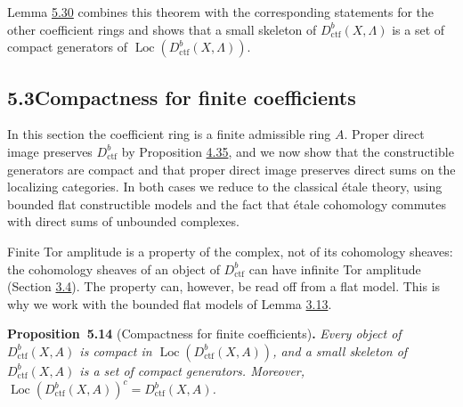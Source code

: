 \documentclass[11pt]{article}
\newenvironment{bpstatement}[2]{\par\addvspace{0.6\baselineskip}\noindent\textbf{#1}#2\textbf{.}\enspace\ignorespaces}
  {\par\addvspace{0.4\baselineskip}}
\newenvironment{bpstatementit}[2]{\begin{bpstatement}{#1}{#2}\itshape\ignorespaces}{\end{bpstatement}}
\providecommand{\Loc}{}\renewcommand{\Loc}{\operatorname{Loc}}
\begin{document}
\label{bp448}%
Lemma \hyperref[bp503]{5.30} combines this theorem with the corresponding statements for the other coefficient rings and shows that a small skeleton of \(D^b_{\mathrm{ctf}}(X,\Lambda)\) is a set of compact generators of \(\Loc(D^b_{\mathrm{ctf}}(X,\Lambda))\).



\subsection*{\texorpdfstring{5.3\quad Compactness for finite coefficients}{5.3 Compactness for finite coefficients}}
\label{bp449}%
\label{bp450}%
In this section the coefficient ring is a finite admissible ring \(A\). Proper direct image preserves \(D^b_{\mathrm{ctf}}\) by Proposition \hyperref[bp390]{4.35}, and we now show that the constructible generators are compact and that proper direct image preserves direct sums on the localizing categories. In both cases we reduce to the classical étale theory, using bounded flat constructible models and the fact that étale cohomology commutes with direct sums of unbounded complexes.

Finite Tor amplitude is a property of the complex, not of its cohomology sheaves: the cohomology sheaves of an object of \(D^b_{\mathrm{ctf}}\) can have infinite Tor amplitude (Section \hyperref[bp230]{3.4}). The property can, however, be read off from a flat model. This is why we work with the bounded flat models of Lemma \hyperref[bp235]{3.13}.

\label{bp451}%
\begin{bpstatementit}{Proposition~5.14}{ (Compactness for finite coefficients)}
Every object of \(D^b_{\mathrm{ctf}}(X,A)\) is compact in \(\Loc(D^b_{\mathrm{ctf}}(X,A))\), and a small skeleton of \(D^b_{\mathrm{ctf}}(X,A)\) is a set of compact generators. Moreover, \(\Loc(D^b_{\mathrm{ctf}}(X,A))^c=D^b_{\mathrm{ctf}}(X,A)\).
\end{bpstatementit}
\end{document}
